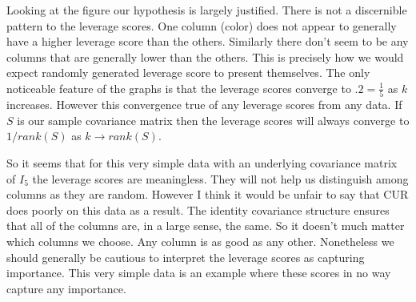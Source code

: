 \documentclass{book}
\begin{document}
Looking at the figure our hypothesis is largely justified. There is not a discernible pattern to the leverage scores. One column (color) does not appear to generally have a higher leverage score than the others. Similarly there don't seem to be any columns that are generally lower than the others. This is precisely how we would expect randomly generated leverage score to present themselves. The only noticeable feature of the graphs is that the leverage scores converge to $.2=\frac{1}{5}$ as $k$ increases. However this convergence true of any leverage scores from any data. If $S$ is our sample covariance matrix then the leverage scores will always converge to $1/rank(S)$ as $k\rightarrow rank(S)$. 

So it seems that for this very simple data with an underlying covariance matrix of $I_5$ the leverage scores are meaningless. They will not help us distinguish among columns as they are random. However I think it would be unfair to say that CUR does poorly on this data as a result. The identity covariance structure ensures that all of the columns are, in a large sense, the same. So it doesn't much matter which columns we choose. Any column is as good as any other. Nonetheless we should generally be cautious to interpret the leverage scores as capturing importance. This very simple data is an example where these scores in no way capture any importance. \newpage
\end{document}
